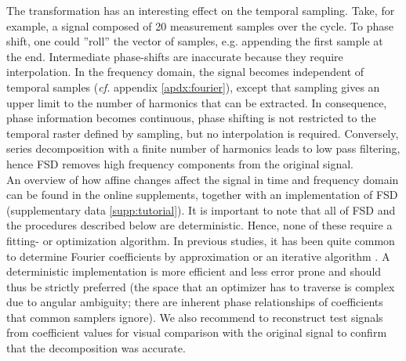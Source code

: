 The transformation has an interesting effect on the temporal sampling.
Take, for example, a signal composed of 20 measurement samples over the cycle.
To phase shift, one could ''roll'' the vector of samples, e.g. appending the first sample at the end.
Intermediate phase-shifts are inaccurate because they require interpolation.
In the frequency domain, the signal becomes independent of temporal samples (\textit{cf.} appendix \ref*{apdx:fourier}), except that sampling gives an upper limit to the number of harmonics that can be extracted.
In consequence, phase information becomes continuous, phase shifting is not restricted to the temporal raster defined by sampling, but no interpolation is required.
Conversely, series decomposition with a finite number of harmonics leads to low pass filtering, hence FSD removes high frequency components from the original signal.
\\An overview of how affine changes affect the signal in time and frequency domain can be found in the online supplements, together with an implementation of FSD (supplementary data \ref*{supp:tutorial}).
It is important to note that all of FSD and the procedures described below are deterministic.
Hence, none of these require a fitting- or optimization algorithm.
In previous studies, it has been quite common to determine Fourier coefficients by approximation \cite[e.g.][]{Alexander1980} or an iterative algorithm \cite[regression, e.g.][]{Hubel2015}.
A deterministic implementation is more efficient and less error prone and should thus be strictly preferred (the space that an optimizer has to traverse is complex due to angular ambiguity; there are inherent phase relationships of coefficients that common samplers ignore).
We also recommend to reconstruct test signals from coefficient values for visual comparison with the original signal to confirm that the decomposition was accurate.



